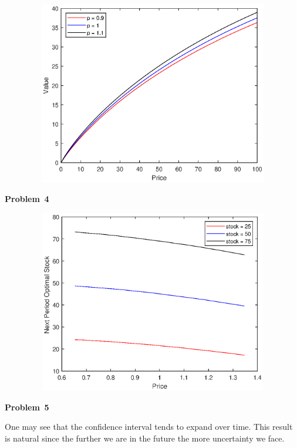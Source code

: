 \documentclass[a4paper,12pt]{article}
\begin{document}
\begin{figure}[h]
\centering
\includegraphics[width=16cm,height=8cm,keepaspectratio]{Pr3_figure.eps}
\end{figure}



\textbf{Problem \textnumero \,4 }

\vspace{\baselineskip}
\begin{figure}[h]
\centering
\includegraphics[width=16cm,height=8cm,keepaspectratio]{Pr4_figure.eps}
\end{figure}
\vspace{\baselineskip}
\newpage

\textbf{Problem \textnumero \,5 }

\vspace{\baselineskip}
One may see that the confidence interval tends to expand over time. This result is natural since the further we are in the future the more uncertainty we face.
\end{document}
